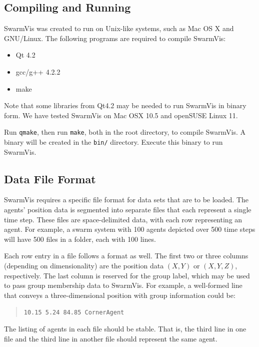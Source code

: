 \documentclass[conference]{IEEEtran}
\begin{document}




\pagebreak


\subsection{Compiling and Running}
SwarmVis was created to run on Unix-like systems, such as Mac OS X and GNU/Linux.
The following programs are required to compile SwarmVis:
\begin{itemize}
\item Qt 4.2
\item gcc/g++ 4.2.2
\item make
\end{itemize}
Note that some libraries from Qt4.2 may be needed to run SwarmVis in binary form.
We have tested SwarmVis on Mac OSX 10.5 and openSUSE Linux 11.

Run \texttt{qmake}, then run \texttt{make}, both in the root directory, to compile SwarmVis.
A binary will be created in the \texttt{bin/} directory. Execute this binary to run SwarmVis.

\subsection{Data File Format}
SwarmVis requires a specific file format for data sets that are to be loaded. The agents' position data is segmented into
separate files that each represent a single time step. These files are space-delimited data, with
each row representing an agent. For example, a swarm system with 100 agents depicted over 500 time steps
will have 500 files in a folder, each with 100 lines.

Each row entry in a file follows a format as well. The first two or three  columns (depending on dimensionality) are the
position data $(X, Y)$ or $(X, Y, Z)$, respectively. The last column is reserved for the group label, which may be used to pass
group membership data to SwarmVis.
For example, a well-formed line that conveys a three-dimensional
position with group information could be:
\begin{quote}
\texttt{10.15 5.24 84.85 CornerAgent}
\end{quote}
The listing of agents in each file should be stable. That is, the third line in one file and the third line in another file
should represent the same agent.
\end{document}
